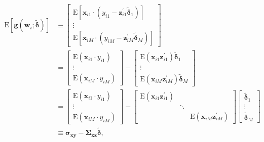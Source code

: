 \documentclass[10pt]{article}
\begin{document}
\begin{align*}
\mathrm{E}\left[\mathbf{g}\left(\mathbf{w}_{i} ; \tilde{\boldsymbol{\delta}}\right)\right] & \equiv\left[\begin{array}{c}
\mathrm{E}\left[\mathbf{x}_{i 1} \cdot\left(y_{i 1}-\mathbf{z}_{i 1}^{\prime} \tilde{\boldsymbol{\delta}}_{1}\right)\right] \\
\vdots \\
\mathrm{E}\left[\mathbf{x}_{i M} \cdot\left(y_{i M}-\mathbf{z}_{i M}^{\prime} \tilde{\boldsymbol{\delta}}_{M}\right)\right]
\end{array}\right] \\
& =\left[\begin{array}{c}
\mathrm{E}\left(\mathbf{x}_{i 1} \cdot y_{i 1}\right) \\
\vdots \\
\mathrm{E}\left(\mathbf{x}_{i M} \cdot y_{i M}\right)
\end{array}\right]-\left[\begin{array}{c}
\mathrm{E}\left(\mathbf{x}_{i 1} \mathbf{z}_{i 1}^{\prime}\right) \tilde{\boldsymbol{\delta}}_{1} \\
\vdots \\
\mathrm{E}\left(\mathbf{x}_{i M} \mathbf{z}_{i M}^{\prime}\right) \tilde{\boldsymbol{\delta}}_{M}
\end{array}\right] \\
& =\left[\begin{array}{c}
\mathrm{E}\left(\mathbf{x}_{i 1} \cdot y_{i 1}\right) \\
\vdots \\
\mathrm{E}\left(\mathbf{x}_{i M} \cdot y_{i M}\right)
\end{array}\right]-\left[\begin{array}{ccc}
\mathrm{E}\left(\mathbf{x}_{i 1} \mathbf{z}_{i 1}^{\prime}\right) & & \\
& \ddots & \\
& & \mathrm{E}\left(\mathbf{x}_{i M} \mathbf{z}_{i M}^{\prime}\right)
\end{array}\right]\left[\begin{array}{c}
\tilde{\boldsymbol{\delta}}_{1} \\
\vdots \\
\tilde{\boldsymbol{\delta}}_{M}
\end{array}\right] \\
& \equiv \boldsymbol{\sigma}_{\mathbf{x y}}-\mathbf{\Sigma}_{\mathbf{x z}} \tilde{\boldsymbol{\delta}}, \tag{4.1.8}
\end{align*}
\end{document}
